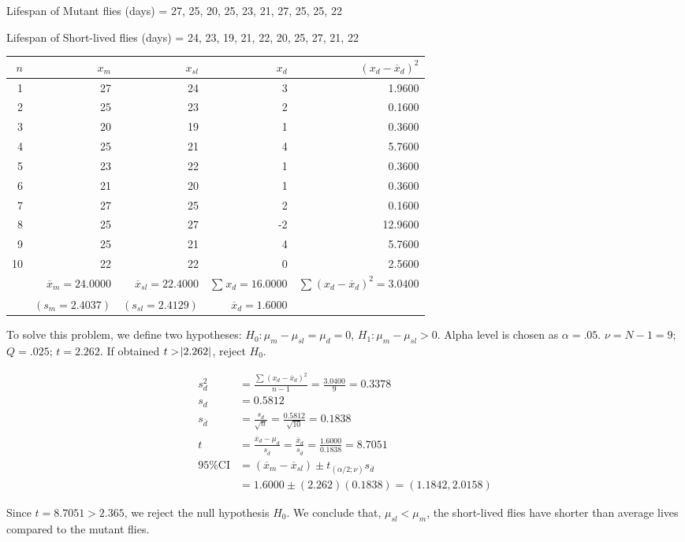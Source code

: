 \documentclass[onecolumn,10pt]{jhwhw}
\begin{document}
Lifespan of Mutant flies (days) = {27, 25, 20, 25, 23, 21, 27, 25, 25, 22}

Lifespan of Short-lived flies (days) = {24, 23, 19, 21, 22, 20, 25, 27, 21, 22}

\begin{center}
\begin{tabular}{r r r r r}
\toprule
$n$ & $x_m$ & $x_{sl}$ & $x_d$ & $(x_d - \overline{x}_d)^2$ \\
\midrule
1 & 27 & 24 & 3  &  1.9600 \\
2 & 25 & 23 & 2  &  0.1600 \\
3 & 20 & 19 & 1  &  0.3600 \\
4 & 25 & 21 & 4  &  5.7600 \\
5 & 23 & 22 & 1  &  0.3600 \\
6 & 21 & 20 & 1  &  0.3600 \\
7 & 27 & 25 & 2  &  0.1600 \\
8 & 25 & 27 & -2 & 12.9600 \\
9 & 25 & 21 & 4  &  5.7600 \\
10 & 22 & 22 & 0 &  2.5600 \\
\hline
\rule{0pt}{4ex} & $\overline{x}_m = 24.0000$ & $\overline{x}_{sl} = 22.4000$ & $\sum_{}^{} x_d = 16.0000 $ & $\sum_{}^{} (x_d - \overline{x}_d)^2 = 3.0400$ \\
\rule{0pt}{4ex}  & $(s_m = 2.4037)$ & $(s_{sl} = 2.4129)$ & $\overline{x}_d = 1.6000$ & \\
\bottomrule
\end{tabular}
\end{center}

To solve this problem, we define two hypotheses: $H_0: \mu_{m} - \mu_{sl} = \mu_d = 0$, $H_1: \mu_{m} - \mu_{sl} > 0$. Alpha level is chosen as $\alpha = .05$. $\nu = N - 1 = 9$; $Q = .025$; $t = 2.262$. If obtained $t > \abs{2.262}$, reject $H_0$.

\begin{equation*}
\begin{split}
s^2_d & = \frac{\sum_{}^{} (x_d - \overline{x}_d)^2}{n-1} = \frac{3.0400}{9} = 0.3378 \\
s_d & = 0.5812 \\
s_{\overline{d}} & = \frac{s_d}{\sqrt{n}} = \frac{0.5812}{\sqrt{10}} = 0.1838 \\
t & = \frac{\overline{x}_d - \mu_{d}}{s_{\overline{d}}} = \frac{\overline{x}_d}{s_{\overline{d}}} = \frac{1.6000}{0.1838} = 8.7051\\
%
\mbox{95\% CI} & = (\overline{x}_m - \overline{x}_{sl}) \pm t_{(\alpha/2;\nu)} s_{\overline{d}} \\
& = 1.6000 \pm (2.262) (0.1838) = (1.1842,2.0158)
\end{split}
\end{equation*}

Since $t = 8.7051 > 2.365$, we reject the null hypothesis $H_0$. We conclude that, $\mu_{sl} < \mu_{m}$, the short-lived flies have shorter than average lives compared to the mutant flies.
\end{document}
